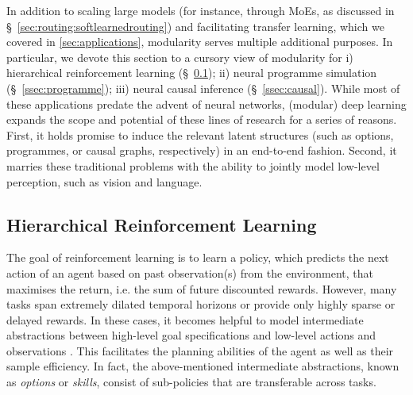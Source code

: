 \documentclass[10pt]{article} %
\begin{document}
In addition to scaling large models (for instance, through MoEs, as discussed in \S~\ref{sec:routing:softlearnedrouting}) and facilitating transfer learning, which we covered in \cref{sec:applications}, modularity serves multiple additional purposes. In particular, we devote this section to a cursory view of modularity for i) hierarchical reinforcement learning (\S~\ref{ssec:hrl}); ii) neural programme simulation (\S~\ref{ssec:programme}); iii) neural causal inference (\S~\ref{ssec:causal}). While most of these applications predate the advent of neural networks, (modular) deep learning expands the scope and potential of these lines of research for a series of reasons. First, it holds promise to induce the relevant latent structures (such as options, programmes, or causal graphs, respectively) in an end-to-end fashion. Second, it marries these traditional problems with the ability to jointly model low-level perception, such as vision and language.

\subsection{Hierarchical Reinforcement Learning}
\label{ssec:hrl}
The goal of reinforcement learning is to learn a policy, which predicts the next action of an agent based on past observation(s) from the environment, that maximises the return, i.e. the sum of future discounted rewards. However, many tasks span extremely dilated temporal horizons or provide only highly sparse or delayed rewards. In these cases, it becomes helpful to model intermediate abstractions between high-level goal specifications and low-level actions and observations \citep{sutton1999between,precup2000temporal}. This facilitates the planning abilities of the agent as well as their sample efficiency. In fact, the above-mentioned intermediate abstractions, known as \textit{options} or \textit{skills}, consist of sub-policies that are transferable across tasks.
\end{document}
